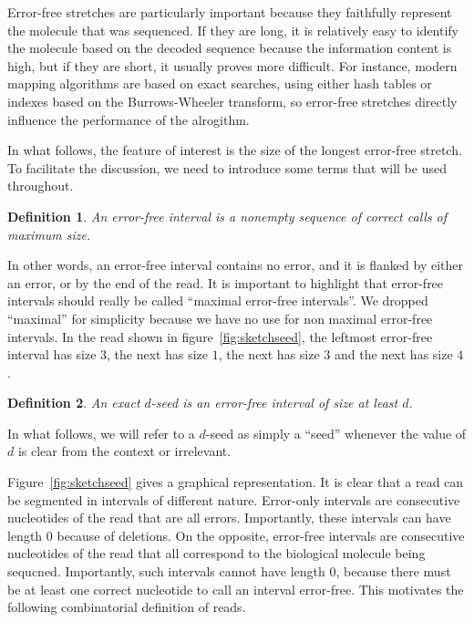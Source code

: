 \documentclass{article}
\newtheorem{definition}{Definition}
\begin{document}
Error-free stretches are particularly important because they faithfully
represent the molecule that was sequenced. If they are long, it is
relatively easy to identify the molecule based on the decoded sequence
because the information content is high, but if they are short, it usually
proves more difficult. For instance, modern mapping algorithms are based
on exact searches, using either hash tables or indexes based on the
Burrows-Wheeler transform, so error-free stretches directly influence the
performance of the alrogithm.

In what follows, the feature of interest is the size of the longest
error-free stretch. To facilitate the discussion, we need to introduce
some terms that will be used throughout.

\begin{definition}
\label{def:interval}
An error-free interval is a nonempty sequence of correct calls of maximum
size.
\end{definition}

In other words, an error-free interval contains no error, and it is
flanked by either an error, or by the end of the read. It is important to
highlight that error-free intervals should really be called ``maximal
error-free intervals''. We dropped ``maximal'' for simplicity because we
have no use for non maximal error-free intervals. In the read shown in
figure~\ref{fig:sketchseed}, the leftmost error-free interval has size
$3$, the next has size $1$, the next has size $3$ and the next has size
$4$.

\begin{definition}
\label{def:seed}
An exact $d$-seed is an error-free interval of size at least $d$.
\end{definition}

In what follows, we will refer to a $d$-seed as simply a ``seed''
whenever the value of $d$ is clear from the context or irrelevant.

Figure~\ref{fig:sketchseed} gives a graphical representation.  It is clear
that a read can be segmented in intervals of different nature.  Error-only
intervals are consecutive nucleotides of the read that are all errors.
Importantly, these intervals can have length $0$ because of deletions. On
the opposite, error-free intervals are consecutive nucleotides of the read
that all correspond to the biological molecule being sequcned.
Importantly, such intervals cannot have length $0$, because there must be
at least one correct nucleotide to call an interval error-free. This
motivates the following combinatorial definition of reads.
\end{document}

